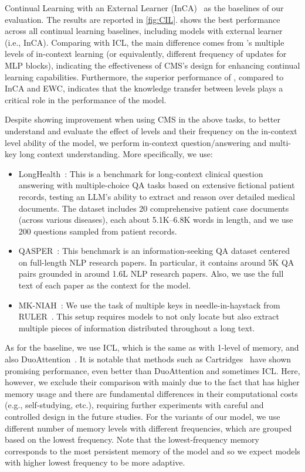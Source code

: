 Continual Learning with an External Learner (InCA)~\citep{momeni2025context}  as the baselines of our evaluation. The results are reported in \autoref{fig:CIL}. \model{} shows the best performance across all continual learning baselines, including models with external learner (i.e., InCA). Comparing \model{} with ICL, the main difference comes from \model's multiple levels of in-context learning (or equivalently, different frequency of updates for MLP blocks), indicating the effectiveness of CMS's design for enhancing continual learning capabilities. Furthermore, the superior performance of \model{}, compared to InCA and EWC, indicates that the knowledge transfer between levels plays a critical role in the performance of the model. 




Despite showing improvement when using CMS in the above tasks, to better understand and evaluate the effect of levels and their frequency on the in-context level ability of the model, we perform in-context question/answering and multi-key long context understanding. More specifically, we use:
\begin{itemize}
    \item LongHealth~\citep{adams2025longhealth}: This is a benchmark for long-context clinical question answering with multiple-choice QA tasks based on extensive fictional patient records, testing an LLM’s ability to extract and reason over detailed medical documents. The dataset includes 20 comprehensive patient case documents (across various diseases), each about 5.1K–6.8K words in length, and we use 200 questions sampled from patient records. 
    \item QASPER~\citep{dasigi2021dataset}: This benchmark is an information-seeking QA dataset centered on full-length NLP research papers. In particular, it contains around 5K QA pairs grounded in around 1.6L NLP research papers. Also, we use the full text of each paper as the context for the model. 
    \item MK-NIAH~\citep{hsieh2024ruler}: We use the task of multiple keys in needle-in-haystack from RULER~\citep{hsieh2024ruler}. This setup requires models to not only locate but also extract multiple pieces of information distributed throughout a long text. 
\end{itemize}
As for the baseline, we use ICL, which is the same as \model{} with 1-level of memory, and also DuoAttention~\citep{xiao2025duoattention}. It is notable that methods such as Cartridges~\citep{eyuboglu2025cartridges} have shown promising performance, even better than DuoAttention and sometimes ICL. Here, however, we exclude their comparison with \model{} mainly due to the fact that \model{} has higher memory usage and there are fundamental differences in their computational costs (e.g., self-studying, etc.), requiring further experiments with careful and controlled design in the future studies. For the variants of our model, we use different number of memory levels with different frequencies, which are grouped based on the lowest frequency. Note that the lowest-frequency memory corresponds to the most persistent memory of the model and so we expect models with higher lowest frequency to be more adaptive.  


